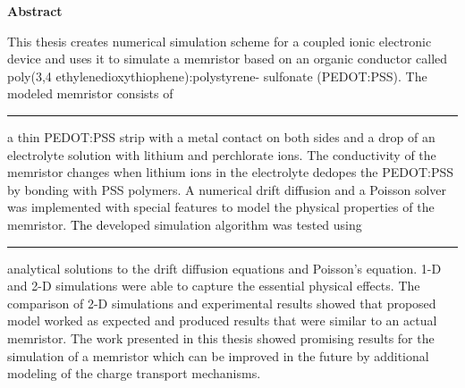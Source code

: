 \documentclass[11pt, a4paper, oneside]{Thesis} %
\newcommand\redout{\bgroup\markoverwith
{\textcolor{red}{\rule[.5ex]{2pt}{1pt}}}\ULon}
\newcommand{\tjs}[1] {\textcolor{black}{#1}}
\newcommand{\tjsr}[2] {\redout{}\textcolor{black}{#2}}
\begin{document}
\Large
\textbf{Abstract}
\newline
\begin{doublespace}
This thesis creates numerical simulation scheme for a coupled ionic electronic device and uses it to simulate a memristor based on an organic conductor called poly(3,4 ethylenedioxythiophene):polystyrene- sulfonate (PEDOT:PSS). The modeled memristor consists of \tjsr{three major parts,}{} a thin PEDOT:PSS strip with a metal contact on both sides and a drop of an electrolyte solution with lithium and perchlorate ions. The conductivity of the memristor changes when lithium ions in the electrolyte dedopes the PEDOT:PSS by bonding with PSS polymers. A numerical drift diffusion and a Poisson solver was implemented with special features to model the physical properties of the memristor. \tjs{The d}eveloped simulation algorithm was tested using \tjsr{the}{} analytical solutions to the drift diffusion equations and Poisson's equation. 1-D and 2-D simulations were able to capture the essential physical effects. The comparison of 2-D simulations and experimental results showed that proposed model worked as expected and produced results that were similar to an actual memristor. The work presented in this thesis showed promising results for the simulation of a memristor which can be improved in the future by additional modeling of the charge transport mechanisms.
\end{doublespace}
\normalsize
\begin{doublespace}

\end{doublespace}



\newpage %



\clearpage %
\end{document}
